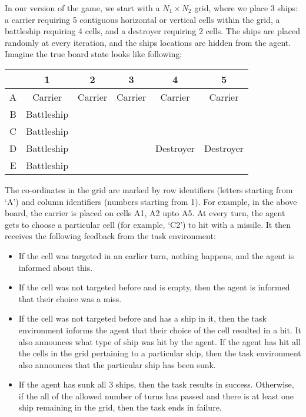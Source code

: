 In our version of the game, we start with a $N_1 \times N_2$ grid, where we place 3 ships: a carrier requiring 5 contiguous horizontal or vertical cells within the grid, a battleship requiring 4 cells, and a destroyer requiring 2 cells. The ships are placed randomly at every iteration, and the ships locations are hidden from the agent. Imagine the true board state looks like following:

\begin{table}[h]
\centering
\begin{tabular}{|c|c|c|c|c|c|}
\hline
& 1 & 2 & 3 & 4 & 5 \\
\hline
A & Carrier & Carrier & Carrier & Carrier & Carrier \\
\hline
B & Battleship & & & & \\
\hline
C & Battleship & & & & \\
\hline
D & Battleship & & & Destroyer & Destroyer \\
\hline
E & Battleship & & & & \\
\hline
\end{tabular}
\end{table}

The co-ordinates in the grid are marked by row identifiers (letters starting from `A') and column identifiers (numbers starting from 1). For example, in the above board, the carrier is placed on cells A1, A2 upto A5. At every turn, the agent gets to choose a particular cell (for example, `C2') to hit with a missile. It then receives the following feedback from the task environment:
\begin{itemize}
    \item If the cell was targeted in an earlier turn, nothing happens, and the agent is informed about this.
    \item If the cell was not targeted before and is empty, then the agent is informed that their choice was a miss.
    \item If the cell was not targeted before and has a ship in it, then the task environment informs the agent that their choice of the cell resulted in a hit. It also announces what type of ship was hit by the agent. If the agent has hit all the cells in the grid pertaining to a particular ship, then the task environment also announces that the particular ship has been sunk.
    \item If the agent has sunk all 3 ships, then the task results in success. Otherwise, if the all of the allowed number of turns has passed and there is at least one ship remaining in the grid, then the task ends in failure.
\end{itemize}


